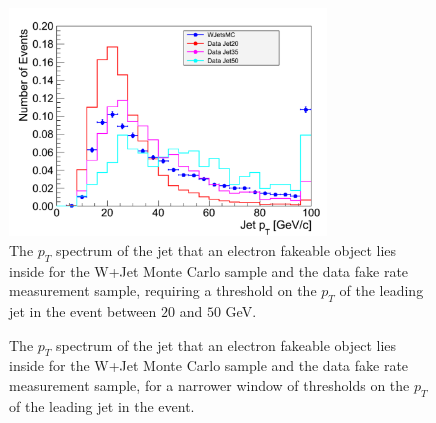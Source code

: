 \begin{figure}[!htbp]
\begin{center}
\includegraphics[width=0.75\textwidth]{figures/LeptonJetPt_ElectronV4_20To50.pdf}
\caption{The $p_{T}$ spectrum of the jet that an electron fakeable object lies inside for the 
W+Jet Monte Carlo sample and the data fake rate measurement sample, requiring a threshold on the $p_{T}$ of 
the leading jet in the event between $20$ and $50$ GeV.}
\label{fig:ele_fr_jetspectrum20To50}
\end{center}
\end{figure}

\begin{figure}[!htbp]
\begin{center}
\caption{The $p_{T}$ spectrum of the jet that an electron fakeable object lies inside for the 
W+Jet Monte Carlo sample and the data fake rate measurement sample, for a narrower window of thresholds
on the $p_{T}$ of the leading jet in the event.}
\label{fig:ele_fr_jetspectrumNarrowerWindow}
\end{center}
\end{figure}


